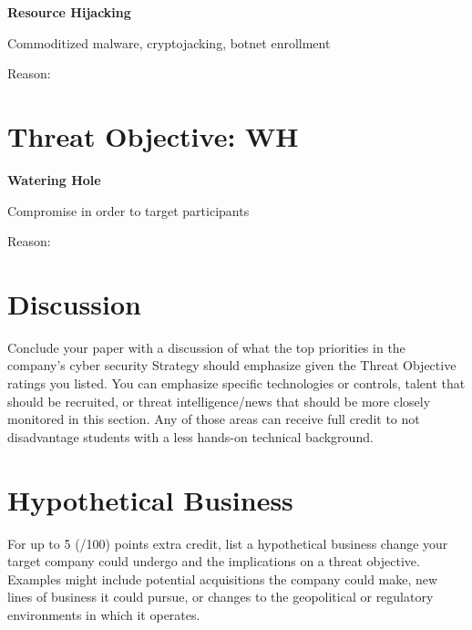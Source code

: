 \documentclass[11pt]{article}
\begin{document}
\textbf{Resource Hijacking}



Commoditized malware,
cryptojacking, 
botnet enrollment


\begin{boxB}
    Reason:

\end{boxB}


\section{Threat Objective: WH}
\textbf{Watering Hole}

Compromise in order to target participants


\begin{boxB}
    Reason:

\end{boxB}


\section{Discussion}
Conclude your paper with a discussion of what the top priorities in the company's cyber security Strategy should emphasize given the Threat Objective ratings you listed. You can emphasize specific technologies or controls, talent that should be recruited, or threat intelligence/news that should be more closely monitored in this section. Any of those areas can receive full credit to not disadvantage students with a less hands-on technical background.



\section{Hypothetical Business}

For up to 5 (/100) points extra credit, list a hypothetical business change your target company could undergo and the implications on a threat objective. Examples might include potential acquisitions the company could make, new lines of business it could pursue, or changes to the geopolitical or regulatory environments in which it operates.


\end{document}

